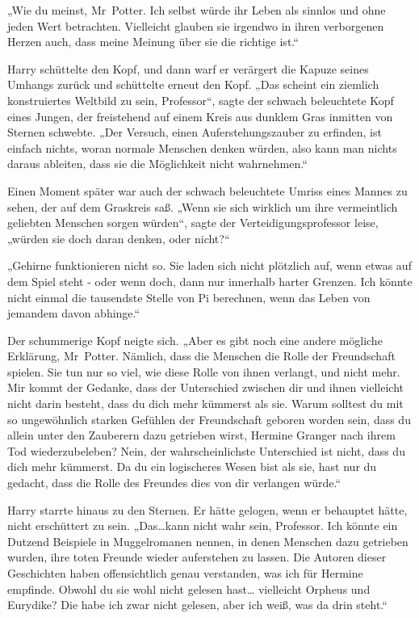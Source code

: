 {„Wie du meinst, Mr~Potter. Ich selbst würde ihr Leben als sinnlos und ohne jeden Wert betrachten. Vielleicht glauben sie irgendwo in ihren verborgenen Herzen auch, dass meine Meinung über sie die richtige ist.“

Harry schüttelte den Kopf, und dann warf er verärgert die Kapuze seines Umhangs zurück und schüttelte erneut den Kopf. „Das scheint ein ziemlich konstruiertes Weltbild zu sein, Professor“, sagte der schwach beleuchtete Kopf eines Jungen, der freistehend auf einem Kreis aus dunklem Gras inmitten von Sternen schwebte. „Der Versuch, einen Auferstehungszauber zu erfinden, ist einfach nichts, woran normale Menschen denken würden, also kann man nichts daraus ableiten, dass sie die Möglichkeit nicht wahrnehmen.“

Einen Moment später war auch der schwach beleuchtete Umriss eines Mannes zu sehen, der auf dem Graskreis saß. „Wenn sie sich wirklich um ihre vermeintlich geliebten Menschen sorgen würden“, sagte der Verteidigungsprofessor leise, „würden sie doch daran denken, oder nicht?“

„Gehirne funktionieren nicht so. Sie laden sich nicht plötzlich auf, wenn etwas auf dem Spiel steht - oder wenn doch, dann nur innerhalb harter Grenzen. Ich könnte nicht einmal die tausendste Stelle von Pi berechnen, wenn das Leben von jemandem davon abhinge.“

Der schummerige Kopf neigte sich. „Aber es gibt noch eine andere mögliche Erklärung, Mr~Potter. Nämlich, dass die Menschen die Rolle der Freundschaft spielen. Sie tun nur so viel, wie diese Rolle von ihnen verlangt, und nicht mehr. Mir kommt der Gedanke, dass der Unterschied zwischen dir und ihnen vielleicht nicht darin besteht, dass du dich mehr kümmerst als sie. Warum solltest du mit so ungewöhnlich starken Gefühlen der Freundschaft geboren worden sein, dass du allein unter den Zauberern dazu getrieben wirst, Hermine Granger nach ihrem Tod wiederzubeleben? Nein, der wahrscheinlichste Unterschied ist nicht, dass du dich mehr kümmerst. Da du ein logischeres Wesen bist als sie, hast nur du gedacht, dass die Rolle des Freundes dies von dir verlangen würde.“

Harry starrte hinaus zu den Sternen. Er hätte gelogen, wenn er behauptet hätte, nicht erschüttert zu sein. „Das…kann nicht wahr sein, Professor. Ich könnte ein Dutzend Beispiele in Muggelromanen nennen, in denen Menschen dazu getrieben wurden, ihre toten Freunde wieder auferstehen zu lassen. Die Autoren dieser Geschichten haben offensichtlich genau verstanden, was ich für Hermine empfinde. Obwohl du sie wohl nicht gelesen hast… vielleicht Orpheus und Eurydike? Die habe ich zwar nicht gelesen, aber ich weiß, was da drin steht.“

}
